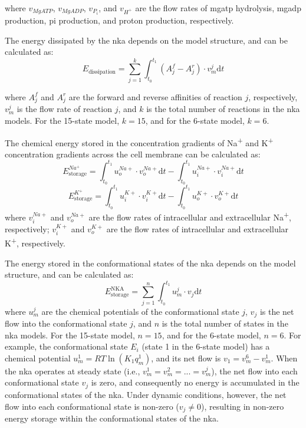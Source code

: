 \documentclass{biophys-new}
\newcommand{\rev}[1]{{\color{black} #1}}
\begin{document}
where $v_{MgATP}$, $v_{MgADP}$, $v_{P_i}$, and $v_{H^+}$ are the flow rates of \gls{mgatp} hydrolysis, \gls{mgadp} production, \gls{pi} production, and proton production, respectively. 

The energy dissipated by the \gls{nka} depends on the model structure, and can be calculated as:
\begin{equation}
      \label{eq:energy_dissipation}
      E_\text{dissipation} = \sum_{j = 1}^{k} \int_{t_0}^{t_1} \left(A^f_{j}-A^r_{j}\right) \cdot v^{j}_m \mathrm{d}t
\end{equation}

where $A^f_{j}$ and $A^r_{j}$ are the forward and reverse affinities of reaction $j$, respectively, $v^{j}_m$ is the flow rate of reaction $j$, and $k$ is the total number of reactions in the \gls{nka} models. For the 15-state model, $k = 15$, and for the 6-state model, $k = 6$.

 The chemical energy stored in the concentration gradients of Na\textsuperscript{+} and K\textsuperscript{+} concentration gradients across the cell membrane can be calculated as:
\begin{equation}
      \label{eq:energy_storage_Na}
      E_\text{storage}^{Na^+} = \int_{t_0}^{t_1}u_o^{Na+} \cdot v_o^{Na+} \mathrm{d}t- \int_{t_0}^{t_1} u_i^{Na+} \cdot v_i^{Na+}  \mathrm{d}t 
\end{equation}
\begin{equation}
      \label{eq:energy_storage_K}
      E_\text{storage}^{K^+} =  \int_{t_0}^{t_1}u_i^{K+} \cdot v_i^{K+} \mathrm{d}t- \int_{t_0}^{t_1} u_o^{K+} \cdot v_o^{K+}  \mathrm{d}t 
\end{equation}
where $v_i^{Na+}$ and $v_o^{Na+}$ are the flow rates of intracellular and extracellular Na\textsuperscript{+}, respectively;
$v_i^{K+}$ and $v_o^{K+}$ are the flow rates of intracellular and extracellular K\textsuperscript{+}, respectively.

\rev{The energy stored in the conformational states of the \gls{nka} depends on the model structure, and can be calculated as:
\begin{equation}
      \label{eq:energy_storage_NKA}
      E_\text{storage}^\text{NKA} = \sum_{j = 1}^{n} \int_{t_0}^{t_1} u^j_m \cdot v_j \mathrm{d}t
\end{equation}
where $u^j_m$ are the chemical potentials of the conformational state $j$, $v_j$ is the net flow into the conformational state $j$, and $n$ is the total number of states in the \gls{nka} models. For the 15-state model, $n = 15$, and for the 6-state model, $n = 6$. For example, the conformational state $E_i$ (state 1 in the 6-state model) has a chemical potential $u^1_m=RT\ln(K_{1}q_m^{1})$, and its net flow is $v_1 = v_m^6- v_m^1$. When the \gls{nka} operates at steady state (i.e., $v_m^1=v_m^2=...=v_m^j$), the net flow into each conformational state $v_j$ is zero, and consequently no energy is accumulated in the conformational states of the \gls{nka}. Under dynamic conditions, however, the net flow into each conformational state is non-zero ($v_j \neq 0$), resulting in non-zero energy storage within the conformational states of the \gls{nka}.}
\end{document}
